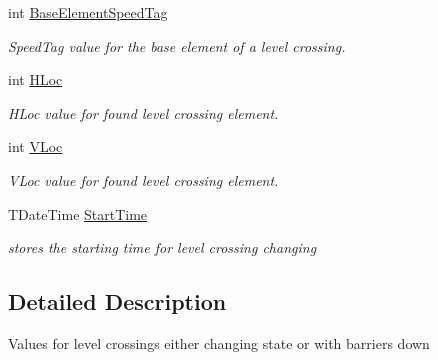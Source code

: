 \begin{DoxyCompactItemize}
\mbox{\label{class_t_track_1_1_t_active_level_crossing_aaca7018cee472ba2b5df1589caa071f7}} 
int \mbox{\hyperlink{class_t_track_1_1_t_active_level_crossing_aaca7018cee472ba2b5df1589caa071f7}{Base\+Element\+Speed\+Tag}}
\begin{DoxyCompactList}\small\item\em Speed\+Tag value for the base element of a level crossing. \end{DoxyCompactList}\item 
\mbox{\label{class_t_track_1_1_t_active_level_crossing_ad935a5012ee1d5bee8767e1c634dafbf}} 
int \mbox{\hyperlink{class_t_track_1_1_t_active_level_crossing_ad935a5012ee1d5bee8767e1c634dafbf}{H\+Loc}}
\begin{DoxyCompactList}\small\item\em H\+Loc value for found level crossing element. \end{DoxyCompactList}\item 
\mbox{\label{class_t_track_1_1_t_active_level_crossing_afabdf5593ed4d0f2f406aac52d7b4fb4}} 
int \mbox{\hyperlink{class_t_track_1_1_t_active_level_crossing_afabdf5593ed4d0f2f406aac52d7b4fb4}{V\+Loc}}
\begin{DoxyCompactList}\small\item\em V\+Loc value for found level crossing element. \end{DoxyCompactList}\item 
\mbox{\label{class_t_track_1_1_t_active_level_crossing_a428974b7cd394ee22cfbcae541cd262b}} 
T\+Date\+Time \mbox{\hyperlink{class_t_track_1_1_t_active_level_crossing_a428974b7cd394ee22cfbcae541cd262b}{Start\+Time}}
\begin{DoxyCompactList}\small\item\em stores the starting time for level crossing changing \end{DoxyCompactList}\end{DoxyCompactItemize}


\subsection{Detailed Description}
Values for level crossings either changing state or with barriers down


